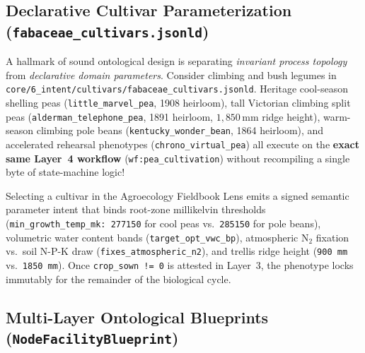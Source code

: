 \subsection{Declarative Cultivar Parameterization (\texttt{fabaceae\_cultivars.jsonld})}

A hallmark of sound ontological design is separating \textit{invariant process topology} from \textit{declarative domain parameters}. Consider climbing and bush legumes in \texttt{core/6\_intent/cultivars/fabaceae\_cultivars.jsonld}. Heritage cool-season shelling peas (\texttt{little\_marvel\_pea}, 1908 heirloom), tall Victorian climbing split peas (\texttt{alderman\_telephone\_pea}, 1891 heirloom, $1{,}850\,\mathrm{mm}$ ridge height), warm-season climbing pole beans (\texttt{kentucky\_wonder\_bean}, 1864 heirloom), and accelerated rehearsal phenotypes (\texttt{chrono\_virtual\_pea}) all execute on the \textbf{exact same Layer~4 workflow} (\texttt{wf:pea\_cultivation}) without recompiling a single byte of state-machine logic!

Selecting a cultivar in the Agroecology Fieldbook Lens emits a signed semantic parameter intent that binds root-zone millikelvin thresholds (\texttt{min\_growth\_temp\_mk: 277150} for cool peas vs.\ \texttt{285150} for pole beans), volumetric water content bands (\texttt{target\_opt\_vwc\_bp}), atmospheric $\mathrm{N}_2$ fixation vs.\ soil N-P-K draw (\texttt{fixes\_atmospheric\_n2}), and trellis ridge height (\texttt{900 mm} vs.\ \texttt{1850 mm}). Once \texttt{crop\_sown != 0} is attested in Layer~3, the phenotype locks immutably for the remainder of the biological cycle.

\subsection{Multi-Layer Ontological Blueprints (\texttt{NodeFacilityBlueprint})}

